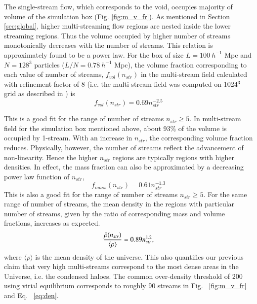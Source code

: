 The single-stream flow, which corresponds to the void, occupies majority of volume of the simulation box (Fig. \ref{fig:m_v_fr}). As mentioned in Section \ref{sec:global}, higher multi-streaming flow regions are nested inside the lower streaming regions. Thus the volume occupied by higher number of streams monotonically decreases with the number of streams. This relation is approximately found to be a power law. For the box of size $L =100 ~h^{-1}$ Mpc and $N = 128^3$ particles ($L/N = 0.78 ~h^{-1}$ Mpc), the volume fraction corresponding to each value of number of streams, $ f_{vol}(n_{str})$ in the multi-stream field calculated with refinement factor of 8 (i.e. the multi-stream field
was computed on 1024$^3$ grid as described in \cite{Shandarin2012}) is 
\begin{equation}
\label{eq:fr_vol}
f_{vol}(n_{str}) =  0.69 n_{str}^{-2.5}
\end{equation}


This is a good fit for the range of number of streams $n_{str} \ge 5 $. In multi-stream field for the simulation box mentioned above, about 93$\%$ of the volume is occupied by 1-stream. With an increase in $n_{str}$, the corresponding volume fraction reduces. Physically, however, the number of streams reflect the advancement of non-linearity. Hence the higher $n_{str}$ regions are typically regions with higher densities. In effect, the mass fraction can also be approximated by a decreasing power law function of $n_{str}$,  
\begin{equation}
\label{eq:fr_mass}
f_{mass}(n_{str}) = 0.61 n_{str}^{-1.3}
\end{equation}
This is also a good fit for the range of number of streams $n_{str} \ge 5 $. For the same range of number of streams, the mean density in the regions with particular number of streams, given by the  ratio of corresponding mass and volume fractions, increases as expected.
\begin{equation}
\label{eq:den}
{\bar{\rho}(n_{str}) \over \langle{\rho}\rangle} = 0.89  n_{str}^{1.2} ,
\end{equation}
where $\langle\rho\rangle$ is the mean density of the universe.
This also quantifies our previous claim that very high multi-streams correspond to the most dense areas in the Universe, i.e. the condensed haloes. The common over-density threshold of 200 using virial equilibrium corresponds to roughly 90 streams in  Fig. ~\ref{fig:m_v_fr} and Eq. ~\ref{eq:den}.

